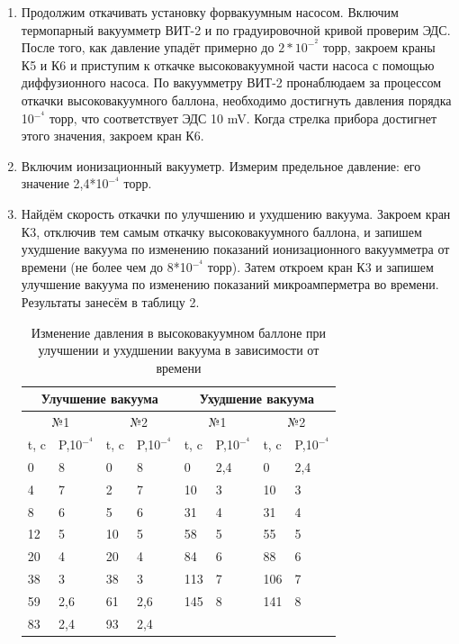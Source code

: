 \documentclass[a4paper]{article}
\begin{document}
\begin{enumerate}
    \item Продолжим откачивать установку форвакуумным насосом. Включим термопарный вакуумметр ВИТ-2 и по градуировочной кривой проверим ЭДС. После того, как давление упадёт примерно до $2*10^-^2$ торр, закроем краны К5 и К6 и приступим к откачке высоковакуумной части насоса с помощью диффузионного насоса. По вакуумметру ВИТ-2 пронаблюдаем за процессом откачки высоковакуумного баллона, необходимо достигнуть давления порядка 10$^-^4$ торр, что соответствует ЭДС 10 mV. Когда стрелка прибора достигнет этого значения, закроем кран К6.
    \item Включим ионизационный вакууметр. Измерим предельное давление: его значение 2,4*10$^-^4$ торр. 
    \item Найдём скорость откачки по улучшению и ухудшению вакуума. Закроем кран К3, отключив тем самым откачку высоковакуумного баллона, и запишем ухудшение вакуума по изменению показаний ионизационного вакуумметра от времени (не более чем до 8*10$^-^4$ торр). Затем откроем кран К3 и запишем улучшение вакуума по изменению показаний микроамперметра во времени. Результаты занесём в таблицу 2.

    \begin{table}[h]
    \centering
    \begin{center}
    \caption{Изменение давления в высоковакуумном баллоне при улучшении и ухудшении вакуума в зависимости от времени}
    \end{center}
    \vspace{0.1cm}
    \label{tab:my_label}
    \begin{tabular}{ |p{0.5cm}|p{1cm}|p{0.5cm}|p{1cm}|p{0.5cm}|p{1cm}|p{0.5cm}|p{1cm}|  }
 \hline
\multicolumn{4}{|c|}{Улучшение вакуума} & \multicolumn{4}{c|}{Ухудшение вакуума} \\
 \hline
  \hline
 \multicolumn{2}{|c|}{№1} & \multicolumn{2}{c|}{№2} &
\multicolumn{2}{c|}{№1} & \multicolumn{2}{c|}{№2} \\
 \hline
t, c & P,10$^-^4$ & t, c & P,10$^-^4$ & t, c & P,10$^-^4$ & t, c & P,10$^-^4$\\
\hline 
0 & 8 & 0 & 8 & 0 & 2,4 & 0 & 2,4\\
4 & 7 & 2 & 7 & 10 & 3 & 10 & 3\\
8 & 6 & 5 & 6 & 31 & 4 & 31 & 4\\
12 & 5 & 10 & 5 & 58 & 5 & 55 & 5\\
20 & 4 & 20 & 4 & 84 & 6 & 88 & 6\\
38 & 3 & 38 & 3 & 113 & 7 & 106 & 7 \\
59 & 2,6 & 61 & 2,6 & 145 & 8 & 141 & 8\\
83 & 2,4 & 93 & 2,4 & & & &\\



\end{tabular}
\end{table}
\end{enumerate}
\end{document}
